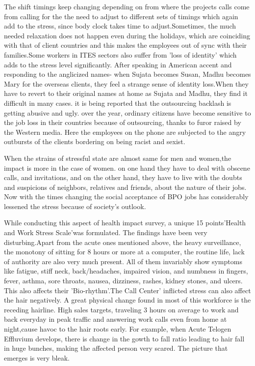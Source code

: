 The shift timings keep changing depending on from where the projects calls come from calling for the the need to adjust to different sets of timings which again add to the stress, since body clock takes time to adjust.Sometimes, the much needed relaxation does not happen even during the holidays, which are coinciding with that of client countries and this makes the employees out of sync with their families.Some workers in ITES sectors also suffer from 'loss of identity' which adds to the stress level significantly. After speaking in American accent and responding to the anglicized names- when Sujata becomes Susan, Madhu becomes Mary for the overseas clients, they feel a strange sense of identity loss.When they have to revert to their original names at home as Sujata and Madhu, they find it difficult in many cases. it is being reported that the outsourcing backlash is getting abusive and ugly. over the year, ordinary citizens have become sensitive to the job loss in their countries because of outsourcing, thanks to furor raised by the Western media. Here the employees on the phone are subjected to the angry outbursts of the clients bordering on being racist and sexist.

When the strains of stressful state are almost same for men and women,the impact is more in the case of women. on one hand they have to deal with obscene calls, and invitations, and on the other hand, they have to live with the doubts and suspicions of neighbors, relatives and friends, about the nature of their jobs. Now with the times changing the social acceptance of BPO jobs has considerably lessened the stress because of society's outlook.

While conducting this aspect of health impact survey, a unique 15 points'Health and Work Stress Scale'was formulated. The findings have been very disturbing.Apart from the acute ones mentioned above, the heavy surveillance, the monotony of sitting for 8 hours or more at a computer, the routine life, lack of authority are also very much present. All of them invariably show symptoms like fatigue, stiff neck, back/headaches, impaired vision, and numbness in fingers, fever, asthma, sore throats, nausea, dizziness, rashes, kidney stones, and ulcers. This also affects their 'Bio-rhythm'.The Call Center' inflicted stress can also affect the hair negatively. A great physical change found in most of this workforce is the receding hairline. High sales targets, traveling 3 hours on average to work and back everyday in peak traffic and answering work calls even from home at night,cause havoc to the hair roots early. For example, when Acute Telogen Effluvium develops, there is change in the gowth to fall ratio leading to hair fall in huge bunches, making the affected person very scared. The picture that emerges is very bleak. 

